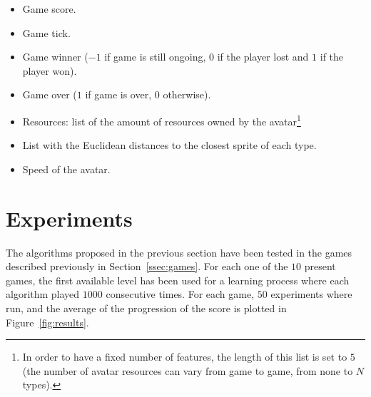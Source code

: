 \documentclass[conference]{IEEEtran}
\newenvironment{mitems}
{\begin{itemize}
\setlength{\itemsep}{1pt}
\setlength{\parskip}{0pt}
\setlength{\parsep}{0pt}}{\end{itemize}}
\begin{document}
\begin{mitems}
\item Game score.
\item Game tick.
\item Game winner ($-1$ if game is still ongoing, $0$ if the player lost and $1$ if the player won).
\item Game over ($1$ if game is over, $0$ otherwise).
\item Resources: list of the amount of resources owned by the avatar\footnote{In order to have a fixed number of features, the length of this list is set to $5$ (the number of avatar resources can vary from game to game, from none to $N$ types).}
\item List with the Euclidean distances to the closest sprite of each type. 
\item Speed of the avatar.
\end{mitems}





\section{Experiments} \label{sec:exp}

The algorithms proposed in the previous section have been tested in the games described previously in Section~\ref{ssec:games}. For each one of the $10$ present games, the first available level has been used for a learning process where each algorithm played $1000$ consecutive times. For each game, $50$ experiments where run, and the average of the progression of the score is plotted in Figure~\ref{fig:results}. 
\end{document}

